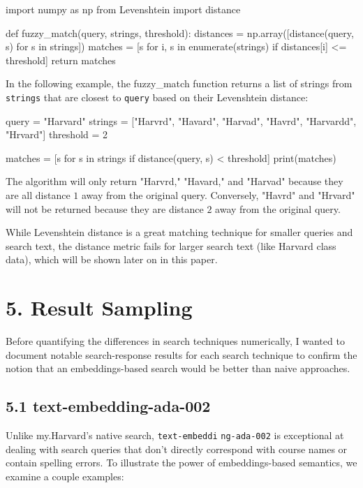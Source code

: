 \documentclass[
	a4paper, %
	10pt, %
	unnumberedsections, %
	twoside, %
]{LTJournalArticle}
\begin{document}
\begin{python}
	import numpy as np
	from Levenshtein import distance

	def fuzzy_match(query, strings, threshold):
		distances = np.array([distance(query, s)
		 for s in strings])
		matches = [s for i, s in 
		enumerate(strings) if 
		distances[i] <= threshold]
		return matches
\end{python}

In the following example, the fuzzy\_match function returns a list of strings from \texttt{strings} that are closest to \texttt{query} based on their Levenshtein distance:

\begin{python}
	query = "Harvard"
	strings = ["Harvrd", "Havard", 
	"Harvad", "Havrd", "Harvardd", "Hrvard"]
	threshold = 2

	matches = [s for s in strings 
	if distance(query, s) < threshold]
	print(matches)
\end{python}

The algorithm will only return "Harvrd," "Havard," and "Harvad" because they are all distance $1$ away from the original query. Conversely, "Havrd" and "Hrvard" will not be returned because they are distance $2$ away from the original query.

While Levenshtein distance is a great matching technique for smaller queries and search text, the distance metric fails for larger search text (like Harvard class data), which will be shown later on in this paper. 

\section{5. Result Sampling}

Before quantifying the differences in search techniques numerically, I wanted to document notable search-response results for each search technique to confirm the notion that an embeddings-based search would be better than naive approaches.

\subsection{5.1 text-embedding-ada-002}

Unlike my.Harvard's native search, \texttt{text-embeddi}
\texttt{ng-ada-002} is exceptional at dealing with search queries that don't directly correspond with course names or contain spelling errors. To illustrate the power of embeddings-based semantics, we examine a couple examples:
\end{document}
